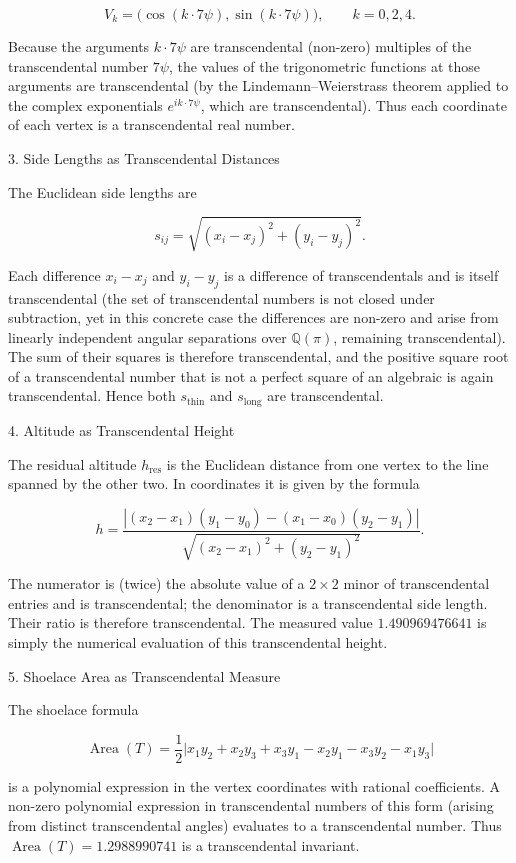 \[
V_k=\bigl(\cos(k\cdot7\psi),\sin(k\cdot7\psi)\bigr),\qquad k=0,2,4.
\]

Because the arguments \(k\cdot7\psi\) are transcendental (non-zero) multiples of the transcendental number \(7\psi\), the values of the trigonometric functions at those arguments are transcendental (by the Lindemann–Weierstrass theorem applied to the complex exponentials \(e^{i k\cdot7\psi}\), which are transcendental). Thus each coordinate of each vertex is a transcendental real number.

3. Side Lengths as Transcendental Distances

The Euclidean side lengths are

\[
s_{ij}=\sqrt{(x_i-x_j)^2+(y_i-y_j)^2}.
\]

Each difference \(x_i-x_j\) and \(y_i-y_j\) is a difference of transcendentals and is itself transcendental (the set of transcendental numbers is not closed under subtraction, yet in this concrete case the differences are non-zero and arise from linearly independent angular separations over \(\mathbb{Q}(\pi)\), remaining transcendental). The sum of their squares is therefore transcendental, and the positive square root of a transcendental number that is not a perfect square of an algebraic is again transcendental. Hence both \(s_{\mathrm{thin}}\) and \(s_{\mathrm{long}}\) are transcendental.

4. Altitude as Transcendental Height

The residual altitude \(h_{\mathrm{res}}\) is the Euclidean distance from one vertex to the line spanned by the other two. In coordinates it is given by the formula

\[
h=\frac{| (x_2-x_1)(y_1-y_0)-(x_1-x_0)(y_2-y_1) |}{\sqrt{(x_2-x_1)^2+(y_2-y_1)^2}}.
\]

The numerator is (twice) the absolute value of a \(2\times2\) minor of transcendental entries and is transcendental; the denominator is a transcendental side length. Their ratio is therefore transcendental. The measured value \(1.490969476641\) is simply the numerical evaluation of this transcendental height.

5. Shoelace Area as Transcendental Measure

The shoelace formula

\[
\operatorname{Area}(T)=\frac12\bigl|x_1y_2+x_2y_3+x_3y_1-x_2y_1-x_3y_2-x_1y_3\bigr|
\]

is a polynomial expression in the vertex coordinates with rational coefficients. A non-zero polynomial expression in transcendental numbers of this form (arising from distinct transcendental angles) evaluates to a transcendental number. Thus \(\operatorname{Area}(T)=1.2988990741\) is a transcendental invariant.

